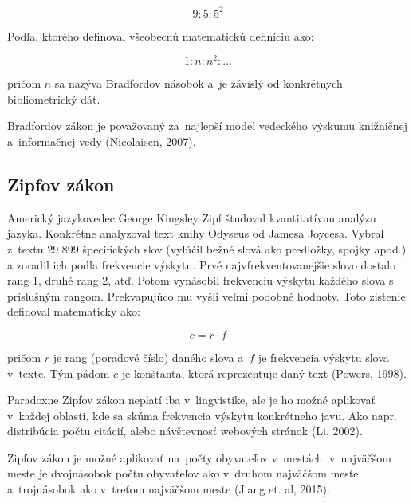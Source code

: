 \begin{equation}
\label{eq:bradfordov_zakon3}
9 : 5 : 5^2
\end{equation}

Podľa, ktorého definoval všeobecnú matematickú definíciu ako:

\begin{equation}
\label{eq:bradfordov_zakon4}
1 : n : n^2 : \dotso
\end{equation}

pričom $n$ sa nazýva Bradfordov násobok a~je závislý od konkrétnych bibliometrický dát.

Bradfordov zákon je považovaný za~najlepší model vedeckého výskumu knižničnej
a~informačnej vedy (Nicolaisen, 2007).


\subsection{Zipfov zákon}

Americký jazykovedec George Kingsley Zipf študoval kvantitatívnu analýzu
jazyka. Konkrétne analyzoval text knihy Odyseus od Jamesa Joycesa. Vybral
z~textu 29 899 špecifických slov (vylúčil bežné slová ako predložky, spojky
apod.)  a zoradil ich podľa frekvencie výskytu. Prvé najvfrekventovanejšie slovo
dostalo rang 1, druhé rang 2, atď. Potom vynásobil frekvenciu výskytu každého
slova s príslušným rangom. Prekvapujúco mu vyšli veľmi podobné hodnoty. Toto
zistenie definoval matematicky ako:

\begin{equation}
\label{eq:zipfov_zakon}
c = r \cdot f
\end{equation}

pričom $r$ je rang (poradové číslo) daného slova a~$f$ je frekvencia výskytu
slova v~texte. Tým pádom $c$ je konštanta, ktorá reprezentuje daný text (Powers,
1998).


Paradoxne Zipfov zákon neplatí iba v~lingvistike, ale je ho možné aplikovať
v~každej oblasti, kde sa skúma frekvencia výskytu konkrétneho javu. Ako
napr. distribúcia počtu citácií, alebo návštevnosť webových stránok (Li, 2002).

Zipfov zákon je možné aplikovať na~počty obyvateľov v~mestách. v~najväčšom meste
je dvojnásobok počtu obyvateľov ako v~druhom najväčšom meste a~trojnásobok ako
v~treťom najväčšom meste (Jiang et. al, 2015).


